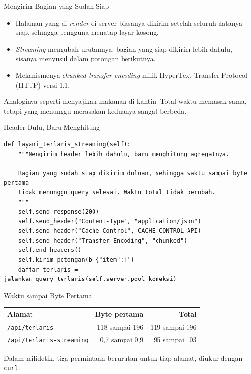\documentclass[aspectratio=169, table, 12pt]{beamer}
\begin{document}
\begin{frame}{{\Large Mengirim Bagian yang Sudah Siap}}
  \vspace{12pt}
  \begin{itemize}
    \item Halaman yang di-\textit{render} di server biasanya dikirim setelah seluruh
          datanya siap, sehingga pengguna menatap layar kosong.
    \item \textit{Streaming} mengubah urutannya: bagian yang siap dikirim
          lebih dahulu, sisanya menyusul dalam potongan berikutnya.
    \item Mekanismenya \textit{chunked transfer encoding} milik HyperText
          Transfer Protocol (HTTP) versi 1.1.
  \end{itemize}
  \vspace{8pt}
  {\footnotesize Analoginya seperti menyajikan makanan di kantin. Total waktu
  memasak sama, tetapi yang menunggu merasakan keduanya sangat berbeda.}
\end{frame}

\begin{frame}[fragile]{{\Large Header Dulu, Baru Menghitung}}
  \vspace{2pt}
\begin{lstlisting}[style=PythonStyle]
  def layani_terlaris_streaming(self):
    """Mengirim header lebih dahulu, baru menghitung agregatnya.

    Bagian yang sudah siap dikirim duluan, sehingga waktu sampai byte pertama
    tidak menunggu query selesai. Waktu total tidak berubah.
    """
    self.send_response(200)
    self.send_header("Content-Type", "application/json")
    self.send_header("Cache-Control", CACHE_CONTROL_API)
    self.send_header("Transfer-Encoding", "chunked")
    self.end_headers()
    self.kirim_potongan(b'{"item":[')
    daftar_terlaris = jalankan_query_terlaris(self.server.pool_koneksi)
\end{lstlisting}
\end{frame}

\begin{frame}{{\Large Waktu sampai Byte Pertama}}
  \vspace{6pt}
  \centering
  {\footnotesize
  \begin{tabularx}{\textwidth}{Yrr}
    \hline
    \textbf{Alamat} & \textbf{Byte pertama} & \textbf{Total} \\
    \hline
    \texttt{/api/terlaris} & 118 sampai 196 & 119 sampai 196 \\
    \hline
    \texttt{/api/terlaris-streaming} & 0,7 sampai 0,9 & 95 sampai 103 \\
    \hline
  \end{tabularx}}

  \vspace{8pt}
  {\footnotesize Dalam milidetik, tiga permintaan berurutan untuk tiap
  alamat, diukur dengan \texttt{curl}.}
\end{frame}
\end{document}
